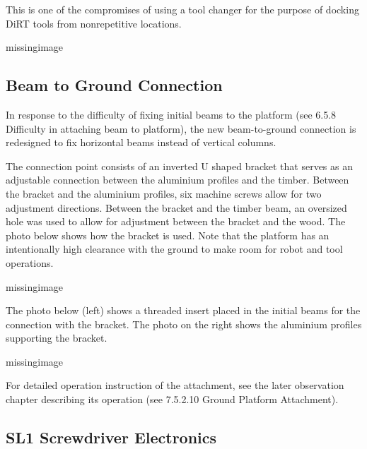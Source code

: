 This is one of the compromises of using a tool changer for the purpose of docking DiRT tools from nonrepetitive locations. 

missingimage

\subsection{Beam to Ground Connection}
\label{subsection:exploration_4_beam_to_ground_connection}

In response to the difficulty of fixing initial beams to the platform (see 6.5.8 Difficulty in attaching beam to platform), the new beam-to-ground connection is redesigned to fix horizontal beams instead of vertical columns. 

The connection point consists of an inverted U shaped bracket that serves as an adjustable connection between the aluminium profiles and the timber. Between the bracket and the aluminium profiles, six machine screws allow for two adjustment directions. Between the bracket and the timber beam, an oversized hole was used to allow for adjustment between the bracket and the wood. The photo below shows how the bracket is used. Note that the platform has an intentionally high clearance with the ground to make room for robot and tool operations.

missingimage

The photo below (left) shows a threaded insert placed in the initial beams for the connection with the bracket. The photo on the right shows the aluminium profiles supporting the bracket.

missingimage

For detailed operation instruction of the attachment, see the later observation chapter describing its operation (see 7.5.2.10 Ground Platform Attachment). 

\subsection{SL1 Screwdriver Electronics}
\label{subsection:exploration_4_sl1_screwdriver_electronics}

